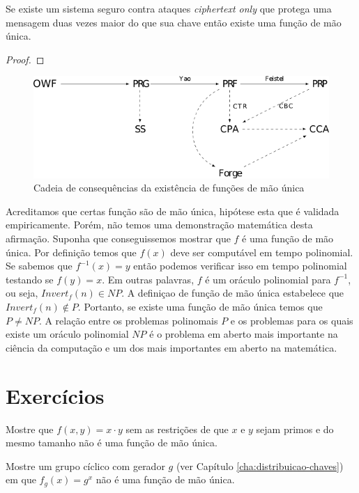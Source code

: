 \begin{theorem}
  Se existe um sistema seguro contra ataques {\em ciphertext only} que protega uma mensagem duas vezes maior do que sua chave então existe uma função de mão única.
\end{theorem}

\begin{proof}
\end{proof}

\begin{figure}[htbp]
  \centering
    \includegraphics[width=.7\textwidth]{imagens/OWF-diagrama.png}
  \caption{Cadeia de consequências da existência de funções de mão única}
  \label{fig:owf-seguranca}
\end{figure}

Acreditamos que certas função são de mão única, hipótese esta que é validada empiricamente.
Porém, não temos uma demonstração matemática desta afirmação.
Suponha que conseguissemos mostrar que $f$ é uma função de mão única.
Por definição temos que $f(x)$ deve ser computável em tempo polinomial.
Se sabemos que $f^{-1}(x) = y$ então podemos verificar isso em tempo polinomial testando se $f(y) = x$.
Em outras palavras, $f$ é um oráculo polinomial para $f^{-1}$, ou seja, $Invert_f(n) \in NP$.
A definiçao de função de mão única estabelece que $Invert_f(n) \notin P$.
Portanto, se existe uma função de mão única temos que $P \neq NP$.
A relação entre os problemas polinomais $P$ e os problemas para os quais existe um oráculo polinomial $NP$ é o problema em aberto mais importante na ciência da computação e um dos mais importantes em aberto na matemática.

\section{Exercícios}
\label{sec:exercicios}

\begin{exercicio}
  Mostre que $f(x,y) = x \cdot y$ sem as restrições de que $x$ e $y$ sejam primos e do mesmo tamanho não é uma função de mão única.
\end{exercicio}


\begin{exercicio}
  Mostre um grupo cíclico com gerador $g$ (ver Capítulo \ref{cha:distribuicao-chaves}) em que $f_g(x) = g^x$ não é uma função de mão única.
\end{exercicio}
